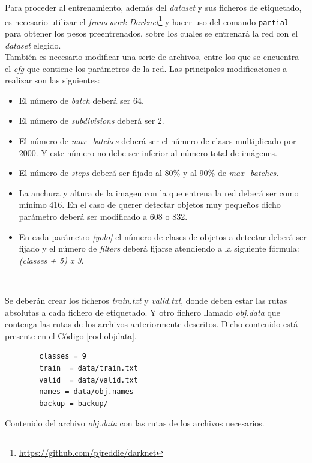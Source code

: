 Para proceder al entrenamiento, además del \textit{dataset} y sus ficheros de etiquetado, es necesario utilizar el \textit{framework} \textit{Darknet}\footnote{\url{https://github.com/pjreddie/darknet}} y hacer uso del comando \verb|partial| para obtener los pesos preentrenados, sobre los cuales se entrenará la red con el \textit{dataset} elegido.\\

También es necesario modificar una serie de archivos, entre los que se encuentra el \textit{cfg} que contiene los parámetros de la red. Las principales modificaciones a realizar son las siguientes:
\begin{itemize}
	\item El número de \textit{batch} deberá ser 64.
	\item El número de \textit{subdivisions} deberá ser 2.
	\item El número de \textit{max\_batches} deberá ser el número de clases multiplicado por 2000. Y este número no debe ser inferior al número total de imágenes.
	\item El número de \textit{steps} deberá ser fijado al 80\% y al 90\% de \textit{max\_batches}.
	\item La anchura y altura de la imagen con la que entrena la red deberá ser como mínimo 416. En el caso de querer detectar objetos muy pequeños dicho parámetro deberá ser modificado a 608 o 832.
	\item En cada parámetro \textit{[yolo]} el número de clases de objetos a detectar deberá ser fijado y el número de \textit{filters} deberá fijarse atendiendo a la siguiente fórmula: \textit{(classes + 5) x 3}.
\end{itemize}\

Se deberán crear los ficheros \textit{train.txt} y \textit{valid.txt}, donde deben estar las rutas absolutas a cada fichero de etiquetado. Y otro fichero llamado \textit{obj.data} que contenga las rutas de los archivos anteriormente descritos. Dicho contenido está presente en el Código \ref{cod:objdata}.\\

\begin{code}[h]
	\begin{lstlisting}
		classes = 9
		train  = data/train.txt
		valid  = data/valid.txt
		names = data/obj.names
		backup = backup/
	\end{lstlisting}
	\caption[Contenido del archivo \textit{obj.data} con las rutas de los archivos necesarios.]{Contenido del archivo \textit{obj.data} con las rutas de los archivos necesarios.}
	\label{cod:objdata}
\end{code}

